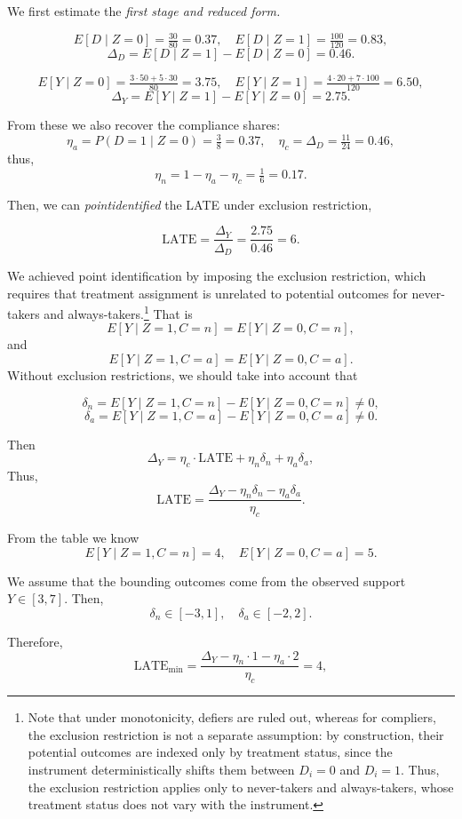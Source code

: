We first estimate the \textit{first stage and reduced form.}

\[
E[D \mid Z=0] = \tfrac{30}{80} = 0.37, \quad
E[D \mid Z=1] = \tfrac{100}{120} = 0.83,
\]
\[
\Delta_D = E[D \mid Z=1] - E[D \mid Z=0] = 0.46.
\]

\[
E[Y \mid Z=0] = \tfrac{3 \cdot 50 + 5 \cdot 30}{80} = 3.75, \quad
E[Y \mid Z=1] = \tfrac{4 \cdot 20 + 7 \cdot 100}{120} = 6.50,
\]
\[
\Delta_Y = E[Y \mid Z=1] - E[Y \mid Z=0] = 2.75.
\]

From these we also recover the compliance shares:
\[
\eta_a = P(D=1 \mid Z=0) = \tfrac{3}{8}=0.37, \quad
\eta_c = \Delta_D = \tfrac{11}{24}=0.46,
\]
thus,
\[
\eta_n = 1 - \eta_a - \eta_c = \tfrac{1}{6}=0.17.
\]

Then, we can \textit{pointidentified} the LATE under exclusion restriction,

\[
\text{LATE} = \frac{\Delta_Y}{\Delta_D}
= \frac{2.75}{0.46}
= 6.
\]

We achieved point identification by imposing the exclusion restriction, which requires that treatment assignment is unrelated to potential outcomes for never-takers and always-takers.\footnote{Note that under monotonicity, defiers are ruled out, whereas for compliers, the exclusion restriction is not a separate assumption: by construction, their potential outcomes are indexed only by treatment status, since the instrument deterministically shifts them between $D_i=0$ and $D_i=1$. Thus, the exclusion restriction applies only to never-takers and always-takers, whose treatment status does not vary with the instrument.} That is
\[
E[Y \mid Z=1, C=n] = E[Y \mid Z=0, C=n],
\]
and
\[
E[Y \mid Z=1, C=a] = E[Y \mid Z=0, C=a].
\]
Without exclusion restrictions, we should take into account that 

\[
\delta_n = E[Y \mid Z=1, C=n] - E[Y \mid Z=0, C=n] \neq 0,
\]
\[
\delta_a = E[Y \mid Z=1, C=a] - E[Y \mid Z=0, C=a] \neq 0.
\]

Then
\[
\Delta_Y = \eta_c \cdot \text{LATE} + \eta_n \delta_n + \eta_a \delta_a,
\]
Thus,
\[
\text{LATE} = \frac{\Delta_Y - \eta_n \delta_n - \eta_a \delta_a}{\eta_c}.
\]

From the table we know
\[
E[Y \mid Z=1, C=n] = 4, \quad E[Y \mid Z=0, C=a] = 5.
\]

We assume that the bounding outcomes come from the observed support \(Y \in [3,7]\). Then,
\[
\delta_n \in [-3,1], \quad \delta_a \in [-2,2].
\]

Therefore,
\[
\text{LATE}_{\min} = \frac{\Delta_Y - \eta_n \cdot 1 - \eta_a \cdot 2}{\eta_c}
= 4,
\]

